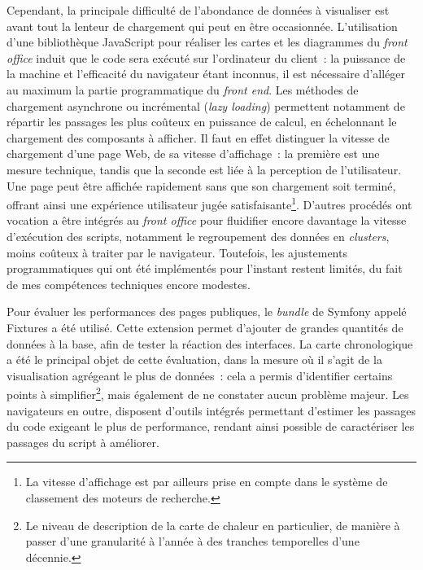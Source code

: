 \documentclass[a4paper,12pt,twoside]{book}
\newcommand{\eng}{\emph}
\newcommand{\fo}{\eng{front office}\xspace}
\begin{document}
Cependant, la principale difficulté de l'abondance de données à visualiser est avant tout la lenteur de chargement qui peut en être occasionnée. L'utilisation d'une bibliothèque JavaScript pour réaliser les cartes et les diagrammes du \fo induit que le code sera exécuté sur l'ordinateur du client~: la puissance de la machine et l'efficacité du navigateur étant inconnus, il est nécessaire d'alléger au maximum la partie programmatique du \eng{front end}. Les méthodes de chargement asynchrone ou incrémental (\eng{lazy loading}) permettent notamment de répartir les passages les plus coûteux en puissance de calcul, en échelonnant le chargement des composants à afficher. Il faut en effet distinguer la vitesse de chargement d'une page Web, de sa vitesse d'affichage~: la première est une mesure technique, tandis que la seconde est liée à la perception de l'utilisateur. Une page peut être affichée rapidement sans que son chargement soit terminé, offrant ainsi une expérience utilisateur jugée satisfaisante\footnote{La vitesse d'affichage est par ailleurs prise en compte dans le système de classement des moteurs de recherche.}. D'autres procédés ont vocation a être intégrés au \fo pour fluidifier encore davantage la vitesse d'exécution des scripts, notamment le regroupement des données en \eng{clusters}, moins coûteux à traiter par le navigateur. Toutefois, les ajustements programmatiques qui ont été implémentés pour l'instant restent limités, du fait de mes compétences techniques encore modestes.

Pour évaluer les performances des pages publiques, le \eng{bundle} de Symfony appelé Fixtures a été utilisé. Cette extension permet d'ajouter de grandes quantités de données à la base, afin de tester la réaction des interfaces. La carte chronologique a été le principal objet de cette évaluation, dans la mesure où il s'agit de la visualisation agrégeant le plus de données~: cela a permis d'identifier certains points à simplifier\footnote{Le niveau de description de la carte de chaleur en particulier, de manière à passer d'une granularité à l'année à des tranches temporelles d'une décennie.}, mais également de ne constater aucun problème majeur. Les navigateurs en outre, disposent d'outils intégrés permettant d'estimer les passages du code exigeant le plus de performance, rendant ainsi possible de caractériser les passages du script à améliorer.
\end{document}
